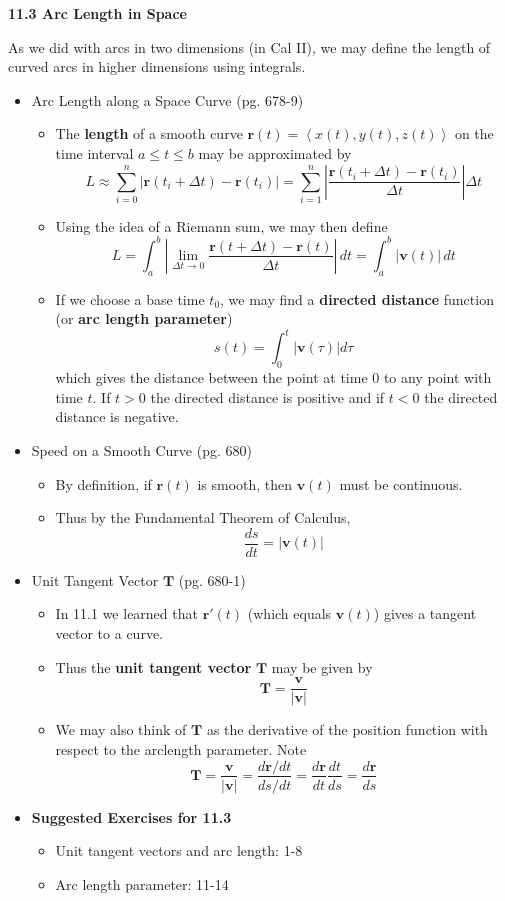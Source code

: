 \documentclass[12pt]{article}
\renewcommand{\vec}[1]{\mathbf{#1}}
\newcommand{\dvar}[1]{\,d{#1}}
\newcommand{\<}{\left<}
\renewcommand{\>}{\right>}
\begin{document}
  \newpage
  
  \centerline{\bf 11.3 Arc Length in Space}
  
  As we did with arcs in two dimensions (in Cal II), we may define the length of curved arcs in higher dimensions using integrals.
  
    \begin{itemize}
    \item Arc Length along a Space Curve (pg. 678-9)
      \begin{itemize}
      \item The \textbf{length} of a smooth curve $\vec{r}(t) = \<x(t),y(t),z(t)\>$ on the time interval $a \leq t \leq b$ may be approximated by \[L \approx \sum_{i=0}^n |\vec{r}(t_i+\Delta{t})-\vec{r}(t_i)|=\sum_{i=1}^n \left|\frac{\vec{r}(t_i+\Delta{t})-\vec{r}(t_i)}{\Delta{t}}\right|\Delta{t}\]
      \item Using the idea of a Riemann sum, we may then define \[L = \int_a^b \left|\lim_{\Delta{t}\to0}\frac{\vec{r}(t+\Delta{t})-\vec{r}(t)}{\Delta{t}}\right| \dvar{t} = \int_a^b |\vec{v}(t)| \dvar{t}\]
      \item If we choose a base time $t_0$, we may find a \textbf{directed distance} function (or \textbf{arc length parameter}) \[s(t) = \int_0^t |\vec{v}(\tau)|d\tau\] which gives the distance between the point at time $0$ to any point with time $t$.  If $t>0$ the directed distance is positive and if $t<0$ the directed distance is negative.
      \end{itemize}
    \item Speed on a Smooth Curve (pg. 680)
      \begin{itemize}
      \item By definition, if $\vec{r}(t)$ is smooth, then $\vec{v}(t)$ must be continuous.
      \item Thus by the Fundamental Theorem of Calculus, \[\frac{ds}{dt} = |\vec{v}(t)|\]
      \end{itemize}
    \item Unit Tangent Vector $\vec{T}$ (pg. 680-1)
      \begin{itemize}
      \item In 11.1 we learned that $\vec{r}'(t)$ (which equals $\vec{v}(t)$) gives a tangent vector to a curve.
      \item Thus the \textbf{unit tangent vector} $\vec{T}$ may be given by \[\vec{T} = \frac{\vec{v}}{|\vec{v}|}\]
      \item We may also think of $\vec{T}$ as the derivative of the position function with respect to the arclength parameter. Note \[\vec{T} = \frac{\vec{v}}{|\vec{v}|}=\frac{d\vec{r}/dt}{ds/dt} = \frac{d\vec{r}}{dt}\frac{dt}{ds} = \frac{d\vec{r}}{ds} \]
      \end{itemize}
    \item \textbf{Suggested Exercises for 11.3}
      \begin{itemize}
      \item Unit tangent vectors and arc length: 1-8
      \item Arc length parameter: 11-14
      \end{itemize}
    \end{itemize}
  
\end{document}
